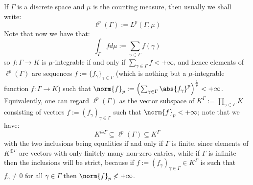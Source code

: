         \begin{example} \label{example: ell_p_spaces}
            If $\Gamma$ is a discrete space and $\mu$ is the counting measure, then usually we shall write:
                $$\ell^p(\Gamma) := L^p(\Gamma, \mu)$$
            Note that now we have that:
                $$\int_\Gamma f d\mu := \sum_{\gamma \in \Gamma} f(\gamma)$$
            so $f: \Gamma \to K$ is $\mu$-integrable if and only if $\sum_{\gamma \in \Gamma} f < +\infty$, and hence elements of $\ell^p(\Gamma)$ are sequences $f := \{f_{\gamma}\}_{\gamma \in \Gamma}$ (which is nothing but a $\mu$-integrable function $f: \Gamma \to K$) such that $\norm{f}_p := \left( \sum_{\gamma \in \Gamma} \abs{f_{\gamma}}^p \right)^{\frac1p} < +\infty$. Equivalently, one can regard $\ell^p(\Gamma)$ as the vector subspace of $K^{\Gamma} := \prod_{\gamma \in \Gamma} K$ consisting of vectors $f := (f_{\gamma})_{\gamma \in \Gamma}$ such that $\norm{f}_p < +\infty$; note that we have:
                $$K^{\oplus \Gamma} \subseteq \ell^p(\Gamma) \subseteq K^{\Gamma}$$
            with the two inclusions being equalities if and only if $\Gamma$ is finite, since elements of $K^{\oplus \Gamma}$ are vectors with only finitely many non-zero entries, while if $\Gamma$ is infinite then the inclusions will be strict, because if $f := ( f_{\gamma} )_{\gamma \in \Gamma} \in K^{\Gamma}$ is such that $f_{\gamma} \not = 0$ for all $\gamma \in \Gamma$ then $\norm{f}_p \not < +\infty$.
        \end{example}

